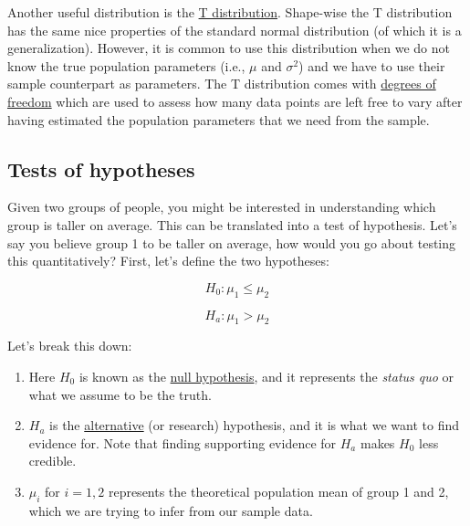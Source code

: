 \documentclass[
  letterpaper,
  DIV=11,
  numbers=noendperiod]{scrartcl}
\providecommand{\tightlist}{%
  \setlength{\itemsep}{0pt}\setlength{\parskip}{0pt}}\usepackage{longtable,booktabs,array}
\begin{document}
Another useful distribution is the
\href{https://en.wikipedia.org/wiki/Student\%27s_t-distribution}{T
distribution}. Shape-wise the T distribution has the same nice
properties of the standard normal distribution (of which it is a
generalization). However, it is common to use this distribution when we
do not know the true population parameters (i.e., \(\mu\) and
\(\sigma^2\)) and we have to use their sample counterpart as parameters.
The T distribution comes with
\href{https://www.scribbr.com/statistics/degrees-of-freedom/\#:~:text=Degrees\%20of\%20freedom\%2C\%20often\%20represented,minus\%20the\%20number\%20of\%20restrictions.}{degrees
of freedom} which are used to assess how many data points are left free
to vary after having estimated the population parameters that we need
from the sample.

\subsection{Tests of hypotheses}\label{sec-testhyp}

Given two groups of people, you might be interested in understanding
which group is taller on average. This can be translated into a test of
hypothesis. Let's say you believe group 1 to be taller on average, how
would you go about testing this quantitatively? First, let's define the
two hypotheses:

\[
H_0: \mu_1 \leq \mu_2
\]

\[
H_a: \mu_1 > \mu_2
\]

Let's break this down:

\begin{enumerate}
\def\labelenumi{\arabic{enumi}.}
\tightlist
\item
  Here \(H_0\) is known as the
  \href{https://en.wikipedia.org/wiki/Null_hypothesis}{null hypothesis},
  and it represents the \emph{status quo} or what we assume to be the
  truth.
\item
  \(H_a\) is the
  \href{https://en.wikipedia.org/wiki/Alternative_hypothesis}{alternative}
  (or research) hypothesis, and it is what we want to find evidence for.
  Note that finding supporting evidence for \(H_a\) makes \(H_0\) less
  credible.
\item
  \(\mu_i\) for \(i = {1,2}\) represents the theoretical population mean
  of group 1 and 2, which we are trying to infer from our sample data.
\end{enumerate}
\end{document}
